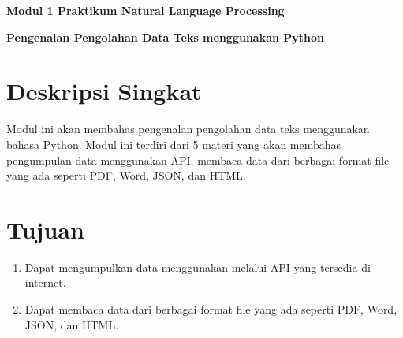 \documentclass{article}
\begin{document}
    \begin{center}
        \textbf{Modul 1 Praktikum Natural Language Processing}

        \textbf{Pengenalan Pengolahan Data Teks menggunakan Python}
    \end{center}

    \section*{Deskripsi Singkat}
    Modul ini akan membahas pengenalan pengolahan data teks menggunakan bahasa Python. Modul ini terdiri dari 5 materi yang akan membahas pengumpulan data menggunakan API, membaca data dari berbagai format file yang ada seperti PDF, Word, JSON, dan HTML\@.

    \section*{Tujuan}
    \begin{enumerate}
        \item Dapat mengumpulkan data menggunakan melalui API yang tersedia di internet.
        \item Dapat membaca data dari berbagai format file yang ada seperti PDF, Word, JSON, dan HTML.\@
    \end{enumerate}
\end{document}
